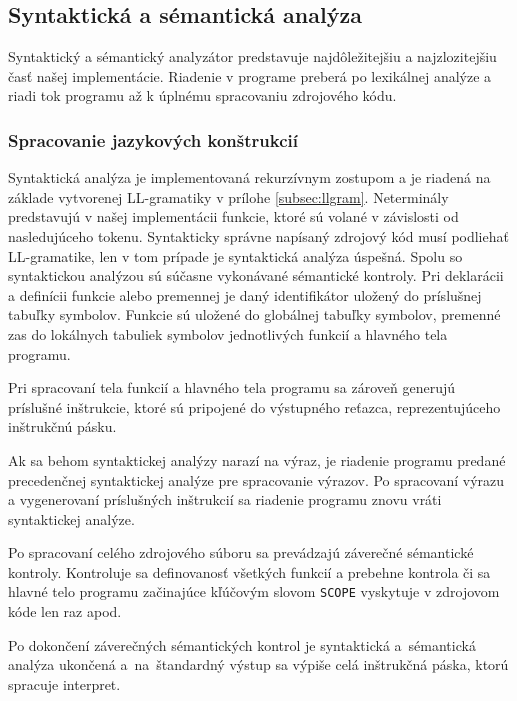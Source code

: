 \documentclass[a4paper, 12pt]{article}
\begin{document}
\subsection{Syntaktická a sémantická analýza} \label{parser}
Syntaktický a sémantický analyzátor predstavuje najdôležitejšiu a najzlozitejšiu časť našej implementácie. Riadenie v programe preberá po lexikálnej analýze a riadi tok programu až k úplnému spracovaniu zdrojového kódu.

\subsubsection{Spracovanie jazykových konštrukcií}
Syntaktická analýza je implementovaná rekurzívnym zostupom a je riadená na základe vytvorenej LL-gramatiky v prílohe \ref{subsec:llgram}. Neterminály predstavujú v našej implementácii funkcie, ktoré sú volané v závislosti od nasledujúceho tokenu. Syntakticky správne napísaný zdrojový kód musí podliehať LL-gramatike, len v tom prípade je syntaktická analýza úspešná.
Spolu so syntaktickou analýzou sú súčasne vykonávané sémantické kontroly. Pri deklarácii a definícii funkcie alebo premennej je daný identifikátor uložený do príslušnej tabuľky symbolov. Funkcie sú uložené do globálnej tabuľky symbolov, premenné zas do lokálnych tabuliek symbolov jednotlivých funkcií a hlavného tela programu. 

Pri spracovaní tela funkcií a hlavného tela programu sa zároveň generujú príslušné inštrukcie, ktoré sú pripojené do výstupného reťazca, reprezentujúceho inštrukčnú pásku.

Ak sa behom syntaktickej analýzy narazí na výraz, je riadenie programu predané precedenčnej syntaktickej analýze pre spracovanie výrazov. Po spracovaní výrazu a vygenerovaní príslušných inštrukcií sa riadenie programu znovu vráti syntaktickej analýze.

Po spracovaní celého zdrojového súboru sa prevádzajú záverečné sémantické kontroly. Kontroluje sa definovanosť všetkých funkcií a prebehne kontrola či sa hlavné telo programu začinajúce kľúčovým slovom \texttt{SCOPE} vyskytuje v zdrojovom kóde len raz apod.

Po dokončení záverečných sémantických kontrol je syntaktická a~sémantická analýza ukončená a~na~štandardný výstup sa výpiše celá inštrukčná páska, ktorú spracuje interpret.

\newpage
\end{document}
